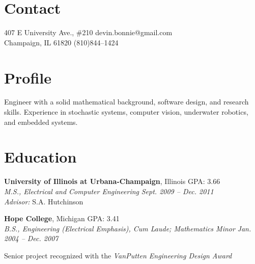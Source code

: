 \documentclass[margin, line]{resume}
\begin{document}
\begin{resume}
\vspace{-2mm}
    \section{\mysidestyle Contact}

	407 E University Ave., \#210		  \hfill devin.bonnie@gmail.com \\ \vspace{-2mm}%
	Champaign, IL 61820                           \hfill   (810)844--1424 \vspace{0mm}\vspace{-2mm}%
    \section{\mysidestyle Profile}
   
Engineer with a solid mathematical background, software design, and research skills. Experience in stochastic systems, computer vision, underwater robotics, and embedded systems. \vspace{-4mm}
    \section{\mysidestyle Education}

    \textbf{University of Illinois at Urbana-Champaign}, Illinois  \hfill GPA: 3.66 \vspace{0mm}\\%
    \textsl{M.S., Electrical and Computer Engineering} \hfill \textsl{Sept. 2009 -- Dec. 2011}\\
    \textsl{Advisor:} S.A. Hutchinson \vspace{-2mm} %

    \textbf{Hope College}, Michigan  \hfill GPA: 3.41\vspace{0mm}\\%
    \textsl{B.S., Engineering (Electrical Emphasis), Cum Laude; Mathematics Minor} \hfill \textsl{Jan. 2004 -- Dec. 2007}\vspace{-3mm}\\\vspace{-1mm}%
    \begin{list2}
        \item Senior project recognized with the \textit{VanPutten Engineering Design Award}
    \end{list2}\vspace{-2mm}


\end{resume}
\end{document}
